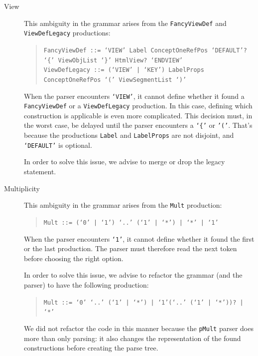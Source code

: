 \begin{description}
  \item[View]
    This ambiguity in the grammar arises from the \texttt{FancyViewDef} and \texttt{ViewDefLegacy} productions:
    \begin{quote}
        \texttt{FancyViewDef ::= `VIEW' Label ConceptOneRefPos `DEFAULT'? `\{' ViewObjList `\}' HtmlView? `ENDVIEW'}\\
        \texttt{ViewDefLegacy ::= (`VIEW' | `KEY') LabelProps ConceptOneRefPos `(' ViewSegmentList `)' }
    \end{quote}
    When the parser encounters \texttt{`VIEW'}, it cannot define whether it found a \texttt{FancyViewDef} or a \texttt{ViewDefLegacy} production.
    In this case, defining which construction is applicable is even more complicated.
    This decision must, in the worst case, be delayed until the parser encounters a \texttt{`\{'} or \texttt{'('}.
    That's because the productions \texttt{Label} and \texttt{LabelProps} are not disjoint, and \texttt{`DEFAULT'} is optional.
    
    In order to solve this issue, we advise to merge or drop the legacy statement.
    
  \item[Multiplicity]
    This ambiguity in the grammar arises from the \texttt{Mult} production:
    \begin{quote}
        \texttt{Mult ::= (`0' | `1') `..' (`1' | `*') | `*' | `1'}
    \end{quote}
    When the parser encounters \texttt{`1'}, it cannot define whether it found the first or the last production.
    The parser must therefore read the next token before choosing the right option.
    
    In order to solve this issue, we advise to refactor the grammar (and the parser) to have the following production:
    \begin{quote}
        \texttt{Mult ::= `0' `..' (`1' | `*') | `1'(`..' (`1' | `*'))? | `*'}
    \end{quote}
    We did not refactor the code in this manner because the \texttt{pMult} parser does more than only parsing: it also changes the representation of the found constructions before creating the parse tree.
  

\end{description}
